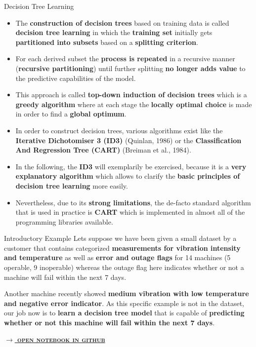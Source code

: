 \documentclass[document.tex]{subfiles}
\begin{document}
    \begin{frame}{Decision Tree Learning}
        \begin{itemize}
            \item The \textbf{construction of decision trees} based on training data is called \textbf{decision tree learning} in which the \textbf{training set} initially gets \textbf{partitioned into subsets} based on a \textbf{splitting criterion}. 
            \item For each derived subset the \textbf{process is repeated} in a recursive manner (\textbf{recursive partitioning}) until further splitting \textbf{no longer adds value} to the predictive capabilities of the model.
            \item This approach is called \textbf{top-down induction of decision trees} which is a \textbf{greedy algorithm} where at each stage the \textbf{locally optimal choice} is made in order to find a \textbf{global optimum}. 
            \item In order to construct decision trees, various algorithms exist like the \textbf{Iterative Dichotomiser 3 (ID3)} (Quinlan, 1986) or the \textbf{Classification And Regression Tree (CART)} (Breiman et al., 1984).
            \item In the following, the \textbf{ID3} will exemplarily be exercised, because it is a \textbf{very explanatory algorithm} which allows to clarify the \textbf{basic principles of decision tree learning} more easily. 
            \item Nevertheless, due to its \textbf{strong limitations}, the de-facto standard algorithm that is used in practice is \textbf{CART} which is implemented in almost all of the programming libraries available.
        \end{itemize}
    \end{frame}

    \begin{frame}{Introductory Example}
        Lets suppose we have been given a small dataset by a customer that contains categorized \textbf{measurements for vibration intensity and temperature} as well as \textbf{error and outage flags} for 14 machines (5 operable, 9 inoperable) whereas the outage flag here indicates whether or not a machine will fail within the next 7 days.

        \begin{table}
            \scalebox{0.8}{}
        \end{table}
        
        Another machine recently showed \textbf{medium vibration with low temperature and negative error indicator}. As this specific example is not in the dataset, our job now is to \textbf{learn a decision tree model} that is capable of \textbf{predicting whether or not this machine will fail within the next 7 days}.
        
        \small{\href{https://nbviewer.jupyter.org/github/saschaschworm/big-data-and-data-science/blob/master/notebooks/demos/outage-decision-tree-learning.ipynb}{\textsc{\textbf{$\rightarrow$ open notebook in github}}}}
    \end{frame}
\end{document}
